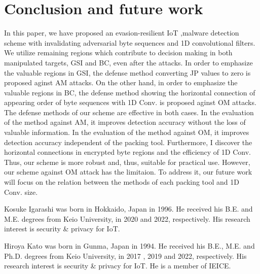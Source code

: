 \documentclass{ieeeaccess}
\begin{document}
\section{Conclusion and future work} \label{sec:conclusion}
In this paper, we have proposed an evasion-resilient IoT ,malware detection scheme with invalidating adversarial byte sequences and 1D convolutional filters. 
We utilize remaining regions which contribute to decision making in both manipulated targets, GSI and BC, even after the attacks.
In order to emphasize the valuable regions in GSI, the defense method converting JP values to zero is proposed aginst AM attacks.
On the other hand, in order to emphasize the valuable regions in BC, the defense method showing the horizontal connection of appearing order of byte sequences with 1D Conv. is proposed aginst OM attacks.
The defense methods of our scheme are effective in both cases.
In the evaluation of the method against AM, it improves detection accuracy without the loss of valuable information.
In the evaluation of the method against OM, it improves detection accuracy independent of the packing tool.
Furthermore, I discover the horizontal connections in encrypted byte regions and the efficiency of 1D Conv.
Thus, our scheme is more robust and, thus, suitable for practical use.
However, our scheme against OM attack has the limitaion.
To address it, our future work will focus on the relation between the methods of each packing tool and 1D Conv. size.



\begin{IEEEbiography}{Kosuke Igarashi} was born in Hokkaido, Japan in 1996. He received his B.E. and M.E. degrees from Keio University, in 2020 and 2022, respectively. His research interest is security \& privacy for IoT.
\end{IEEEbiography}

\begin{IEEEbiography}{Hiroya Kato} was born in Gunma, Japan in 1994. He received his B.E., M.E. and Ph.D. degrees from Keio University, in 2017 , 2019 and 2022, respectively. His research interest is security \& privacy for IoT. He is a member of IEICE.
\end{IEEEbiography} 
\end{document}
